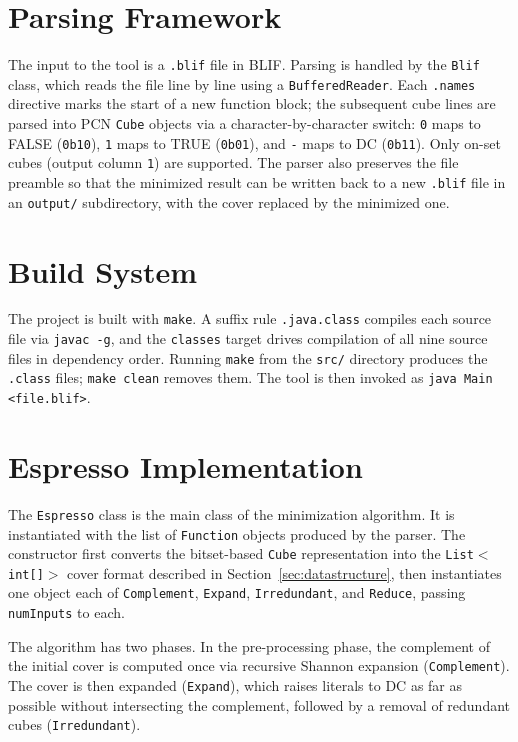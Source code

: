 \section{Parsing Framework}

The input to the tool is a \texttt{.blif} file in \ac{BLIF}. Parsing is handled by the \texttt{Blif} class, which reads the file line by line using a \texttt{BufferedReader}. Each \texttt{.names} directive marks the start of a new function block; the subsequent cube lines are parsed into \ac{PCN} \texttt{Cube} objects via a character-by-character switch: \texttt{0} maps to FALSE (\texttt{0b10}), \texttt{1} maps to TRUE (\texttt{0b01}), and \texttt{-} maps to \ac{DC} (\texttt{0b11}). Only on-set cubes (output column \texttt{1}) are supported. The parser also preserves the file preamble so that the minimized result can be written back to a new \texttt{.blif} file in an \texttt{output/} subdirectory, with the cover replaced by the minimized one.

\section{Build System}

The project is built with \texttt{make}. A suffix rule \texttt{.java.class} compiles each source file via \texttt{javac -g}, and the \texttt{classes} target drives compilation of all nine source files in dependency order. Running \texttt{make} from the \texttt{src/} directory produces the \texttt{.class} files; \texttt{make clean} removes them. The tool is then invoked as \texttt{java Main <file.blif>}.

\section{Espresso Implementation}

The \texttt{Espresso} class is the main class of the minimization algorithm. It is instantiated with the list of \texttt{Function} objects produced by the parser. The constructor first converts the bitset-based \texttt{Cube} representation into the \texttt{List$<$int[]$>$} cover format described in Section~\ref{sec:datastructure}, then instantiates one object each of \texttt{Complement}, \texttt{Expand}, \texttt{Irredundant}, and \texttt{Reduce}, passing \texttt{numInputs} to each.

The algorithm has two phases. In the pre-processing phase, the complement of the initial cover is computed once via recursive Shannon expansion (\texttt{Complement}). The cover is then expanded (\texttt{Expand}), which raises literals to \ac{DC} as far as possible without intersecting the complement, followed by a removal of redundant cubes (\texttt{Irredundant}).

